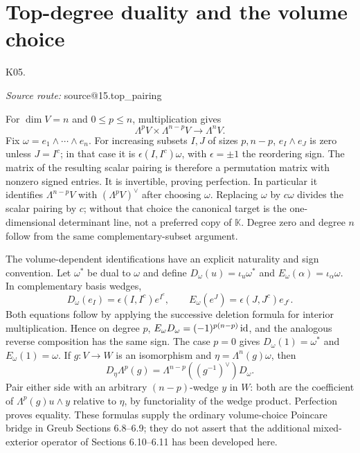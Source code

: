 \documentclass[11pt,a4paper]{book}
\makeatletter
\theoremstyle{definition}\newtheorem{definition}[theorem]{Definition}
\theoremstyle{remark}\newtheorem{remark}[theorem]{Remark}
\newcommand{\K}{\mathbb K}\newcommand{\R}{\mathbb R}\newcommand{\C}{\mathbb C}
\newcommand{\Kentry}[2]{\section{#2}\label{k:#1}\noindent\textsf{\small K05.\detokenize{#1}}\par
  \begingroup\small\color{black!65}\textit{Source route: }\csname source@#1\endcsname\par\endgroup}
\makeatother
\begin{document}
\Kentry{15.top_pairing}{Top-degree duality and the volume choice}
For $\dim V=n$ and $0\le p\le n$, multiplication gives
\[
 \Lambda^pV\times\Lambda^{n-p}V\longrightarrow\Lambda^nV.
\]
Fix $\omega=e_1\wedge\cdots\wedge e_n$. For increasing subsets $I,J$ of sizes $p,n-p$, $e_I\wedge e_J$ is zero unless $J=I^c$; in that case it is $\epsilon(I,I^c)\omega$, with $\epsilon=\pm1$ the reordering sign. The matrix of the resulting scalar pairing is therefore a permutation matrix with nonzero signed entries. It is invertible, proving perfection. In particular it identifies $\Lambda^{n-p}V$ with $(\Lambda^pV)^\vee$ after choosing $\omega$. Replacing $\omega$ by $c\omega$ divides the scalar pairing by $c$; without that choice the canonical target is the one-dimensional determinant line, not a preferred copy of $\K$. Degree zero and degree $n$ follow from the same complementary-subset argument.


The volume-dependent identifications have an explicit naturality and sign convention. Let $\omega^*$ be dual to $\omega$ and define $D_\omega(u)=\iota_u\omega^*$ and $E_\omega(\alpha)=\iota_\alpha\omega$. In complementary basis wedges,
\[
 D_\omega(e_I)=\epsilon(I,I^c)e^{I^c},\qquad
 E_\omega(e^J)=\epsilon(J,J^c)e_{J^c}.
\]
Both equations follow by applying the successive deletion formula for interior multiplication. Hence on degree $p$, $E_\omega D_\omega=(-1)^{p(n-p)}\operatorname{id}$, and the analogous reverse composition has the same sign. The case $p=0$ gives $D_\omega(1)=\omega^*$ and $E_\omega(1)=\omega$. If $g:V\to W$ is an isomorphism and $\eta=\Lambda^n(g)\omega$, then
\[
 D_\eta\Lambda^p(g)=\Lambda^{n-p}((g^{-1})^\vee)D_\omega.
\]
Pair either side with an arbitrary $(n-p)$-wedge $y$ in $W$: both are the coefficient of $\Lambda^p(g)u\wedge y$ relative to $\eta$, by functoriality of the wedge product. Perfection proves equality. These formulas supply the ordinary volume-choice Poincare bridge in Greub Sections 6.8--6.9; they do not assert that the additional mixed-exterior operator of Sections 6.10--6.11 has been developed here.
\end{document}
